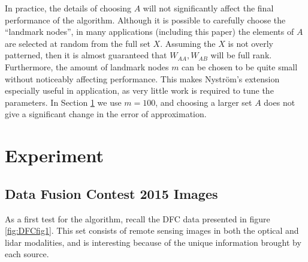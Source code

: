 \documentclass[journal]{IEEEtran}
\begin{document}
In practice, the details of choosing $A$ will not significantly affect the final
performance of the algorithm. Although it is possible to carefully choose the 
``landmark nodes'', in many applications (including this paper) the elements of
$A$ are selected at random from the full set $X$. Assuming the $X$ is not overly
patterned, then it is almost guaranteed that $W_{AA},W_{AB}$ will be full
rank. Furthermore, the amount of landmark nodes $m$ can be chosen to be quite
small without noticeably affecting performance. This makes Nystr\"{o}m's
extension especially useful in application, as very little work is required to
tune the parameters.  In Section \ref{sec:experiment} we use $m = 100$, and
choosing a larger set $A$ does not give a significant change in the error of
approximation.

\section{Experiment}
\label{sec:experiment}

\subsection{Data Fusion Contest 2015 Images}
\label{sec:DFCexperiment}

As a first test for the algorithm, recall the DFC data presented in figure
\ref{fig:DFCfig1}. This set consists of remote sensing images in both the
optical and lidar modalities, and is interesting because of the unique
information brought by each source.
\end{document}
